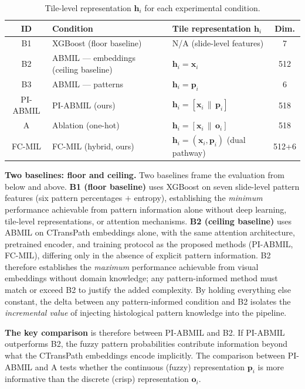 \begin{table}[ht!]
\centering
\caption{Tile-level representation $\mathbf{h}_i$ for each experimental condition.}
\label{tab:tile_representations}
\begin{tabular}{c l l c}
\hline
\textbf{ID} & \textbf{Condition} & \textbf{Tile representation $\mathbf{h}_i$} & \textbf{Dim.} \\
\hline
B1 & XGBoost (floor baseline) & N/A (slide-level features) & 7 \\
B2 & ABMIL --- embeddings (ceiling baseline) & $\mathbf{h}_i = \mathbf{x}_i$ & 512 \\
B3 & ABMIL --- patterns & $\mathbf{h}_i = \mathbf{p}_i$ & 6 \\
PI-ABMIL  & PI-ABMIL (ours) & $\mathbf{h}_i = [\mathbf{x}_i \,\|\, \mathbf{p}_i]$ & 518 \\
A  & Ablation (one-hot) & $\mathbf{h}_i = [\mathbf{x}_i \,\|\, \mathbf{o}_i]$ & 518 \\
FC-MIL & FC-MIL (hybrid, ours) & $\mathbf{h}_i = (\mathbf{x}_i, \mathbf{p}_i)$ (dual pathway) & 512+6 \\
\hline
\end{tabular}
\end{table}

\textbf{Two baselines: floor and ceiling.}
Two baselines frame the evaluation from below and above.
\textbf{B1 (floor baseline)} uses XGBoost on seven slide-level pattern
features (six pattern percentages $+$ entropy), establishing the
\emph{minimum} performance achievable from pattern information alone
without deep learning, tile-level representations, or attention
mechanisms.
\textbf{B2 (ceiling baseline)} uses ABMIL on CTransPath embeddings
alone, with the same attention architecture, pretrained encoder, and
training protocol as the proposed methods (PI-ABMIL, FC-MIL),
differing only in the absence of explicit pattern information.
B2 therefore establishes the \emph{maximum} performance achievable
from visual embeddings without domain knowledge; any pattern-informed
method must match or exceed B2 to justify the added complexity.
By holding everything else constant, the delta between any
pattern-informed condition and B2 isolates the \emph{incremental value}
of injecting histological pattern knowledge into the pipeline.

\textbf{The key comparison} is therefore between PI-ABMIL and B2.
If PI-ABMIL outperforms B2, the fuzzy pattern probabilities contribute information beyond what the CTransPath embeddings encode implicitly.
The comparison between PI-ABMIL and A tests whether the continuous (fuzzy) representation $\mathbf{p}_i$ is more informative than the discrete (crisp) representation $\mathbf{o}_i$.

